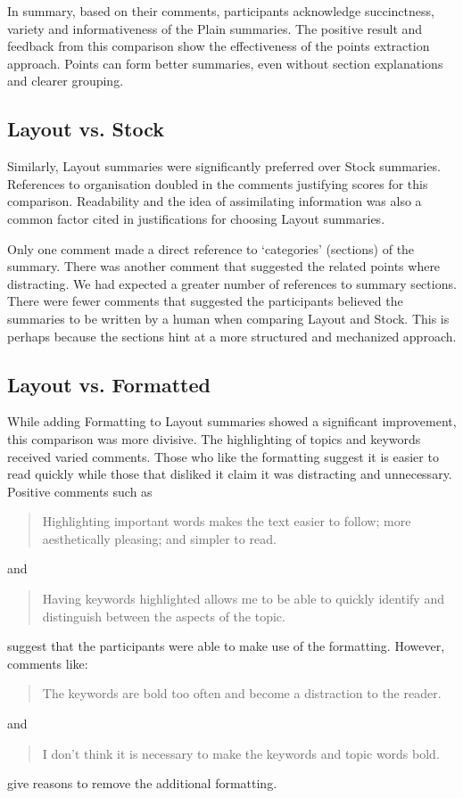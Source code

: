       In summary, based on their comments, participants acknowledge succinctness, variety and informativeness of the Plain summaries. The positive result and feedback from this comparison show the effectiveness of the points extraction approach. Points can form better summaries, even without section explanations and clearer grouping.

    \tocless\subsection{Layout vs. Stock}
      Similarly, Layout summaries were significantly preferred over Stock summaries. References to organisation doubled in the comments justifying scores for this comparison. Readability and the idea of assimilating information was also a common factor cited in justifications for choosing Layout summaries.

      Only one comment made a direct reference to `categories' (sections) of the summary. There was another comment that suggested the related points where distracting. We had expected a greater number of references to summary sections. There were fewer comments that suggested the participants believed the summaries to be written by a human when comparing Layout and Stock. This is perhaps because the sections hint at a more structured and mechanized approach.

    \tocless\subsection{Layout vs. Formatted}
      While adding Formatting to Layout summaries showed a significant improvement, this comparison was more divisive. The highlighting of topics and keywords received varied comments. Those who like the formatting suggest it is easier to read quickly while those that disliked it claim it was distracting and unnecessary. Positive comments such as \blockquote{Highlighting important words makes the text easier to follow; more aesthetically pleasing; and simpler to read.} and \blockquote{Having keywords highlighted allows me to be able to quickly identify and distinguish between the aspects of the topic.} suggest that the participants were able to make use of the formatting. However, comments like: \blockquote{The keywords are bold too often and become a distraction to the reader.} and \blockquote{I don't think it is necessary to make the keywords and topic words bold.} give reasons to remove the additional formatting.

